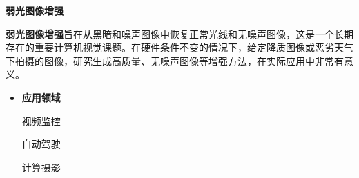 \documentclass[CJK,aspectratio=169]{beamer}  %
\begin{document}
	\begin{frame}

	{ \yahei \textbf{弱光图像增强}}
	
	\vspace{0.3cm}

		{ \yahei \textbf{弱光图像增强}旨在从黑暗和噪声图像中恢复正常光线和无噪声图像，这是一个长期存在的重要计算机视觉课题。在硬件条件不变的情况下，给定降质图像或恶劣天气下拍摄的图像，研究生成高质量、无噪声图像等增强方法，在实际应用中非常有意义。}


		\begin{itemize} 
		\item { \yahei \textbf{应用领域}}

		视频监控
			
			
				
		自动驾驶
			
				          			
		计算摄影
		\end{itemize}

	\end{frame}
	
\end{document}
